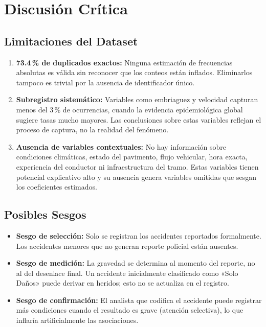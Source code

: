 \documentclass[11pt,a4paper]{article}
\begin{document}
\section{Discusión Crítica}

\subsection{Limitaciones del Dataset}

\begin{enumerate}
  \item \textbf{73.4\,\% de duplicados exactos:} Ninguna estimación de frecuencias
        absolutas es válida sin reconocer que los conteos están inflados. Eliminarlos
        tampoco es trivial por la ausencia de identificador único.
  \item \textbf{Subregistro sistemático:} Variables como embriaguez y velocidad capturan
        menos del 3\,\% de ocurrencias, cuando la evidencia epidemiológica global sugiere
        tasas mucho mayores. Las conclusiones sobre estas variables reflejan el proceso de
        captura, no la realidad del fenómeno.
  \item \textbf{Ausencia de variables contextuales:} No hay información sobre condiciones
        climáticas, estado del pavimento, flujo vehicular, hora exacta, experiencia del
        conductor ni infraestructura del tramo. Estas variables tienen potencial explicativo
        alto y su ausencia genera variables omitidas que sesgan los coeficientes estimados.
\end{enumerate}

\subsection{Posibles Sesgos}

\begin{itemize}
  \item \textbf{Sesgo de selección:} Solo se registran los accidentes reportados
        formalmente. Los accidentes menores que no generan reporte policial están ausentes.
  \item \textbf{Sesgo de medición:} La gravedad se determina al momento del reporte, no
        al del desenlace final. Un accidente inicialmente clasificado como «Solo Daños»
        puede derivar en heridos; esto no se actualiza en el registro.
  \item \textbf{Sesgo de confirmación:} El analista que codifica el accidente puede
        registrar más condiciones cuando el resultado es grave (atención selectiva), lo que
        inflaría artificialmente las asociaciones.
\end{itemize}
\end{document}
